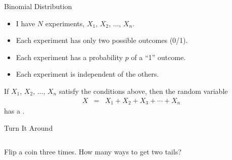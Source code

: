 \begin{frame}{Binomial Distribution}

  \begin{itemize}
  \item I have $N$ experiments, $X_1$, $X_2$, $\ldots$, $X_n$.
  \item Each experiment has only two possible outcomes (0/1).
  \item Each experiment has a probability $p$ of a ``1'' outcome.
  \item Each experiment is independent of the others.
  \end{itemize}

  \vfill

  \begin{definition}
    If $X_1$, $X_2$, $\ldots$, $X_n$ satisfy the conditions above,
    then the random variable
    \begin{eqnarray*}
      X & = & X_1 + X_2 + X_3 + \cdots + X_n
    \end{eqnarray*}
    has a .
  \end{definition}

\end{frame}

\begin{frame}{Turn It Around}

 \begin{columns}

    Flip a coin three times. How many ways to get two tails?



  \end{columns}
  
\end{frame}



